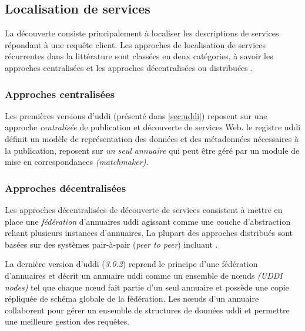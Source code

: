 \subsection{Localisation de services}
\label{sec:ws-localisation}
  La découverte consiste principalement à localiser les descriptions
  de services répondant à une requête client. Les approches de
  localisation de services récurrentes dans la littérature sont
  classées en deux catégories, à savoir les approches centralisées et
  les approches décentralisées ou distribuées
  \cite{garofalakis2004web}.

    \subsubsection{Approches centralisées}
    Les premières versions d'\acrshort{uddi} \cite{clement2004uddi}
    (présenté dans \ref{sec:uddi}) reposent sur une approche
    \textit{centralisée} de publication et découverte de services
    Web. le registre \acrshort{uddi} définit un modèle de
    représentation des données et des métadonnées nécessaires à la
    publication, reposent sur \textit{un seul annuaire} qui peut être
    géré par un module de mise en correspondances
    \textit{(matchmaker)}.

    \subsubsection{Approches décentralisées}
    Les approches décentralisées de découverte de services
    \cite{rompothong2003query, sivashanmugam2004discovery,
      paolucci2003using, schmidt2004peer, verma2005meteor,
      sahin2005spider} consistent à mettre en place une
    \textit{fédération} d'annuaires \acrshort{uddi} agissant comme une
    couche d'abstraction reliant plusieurs instances d'annuaires. La
    plupart des approches distribués sont basées sur des systèmes
    pair-à-pair (\textit{peer to peer}) incluant
    \cite{schmidt2004peer, verma2005meteor, sahin2005spider}.

    La dernière version d'\acrshort{uddi} \cite{oasis2005specification}
    (\textit{3.0.2}) reprend le principe d'une fédération d'annuaires
    et décrit un annuaire \acrshort{uddi} comme un ensemble de nœuds
    \textit{(UDDI nodes)} tel que chaque nœud fait partie d'un seul
    annuaire et possède une copie répliquée de schéma globale de la
    fédération. Les nœuds d'un annuaire collaborent pour gérer un
    ensemble de structures de données \acrshort{uddi} et permettre une
    meilleure gestion des requêtes.

